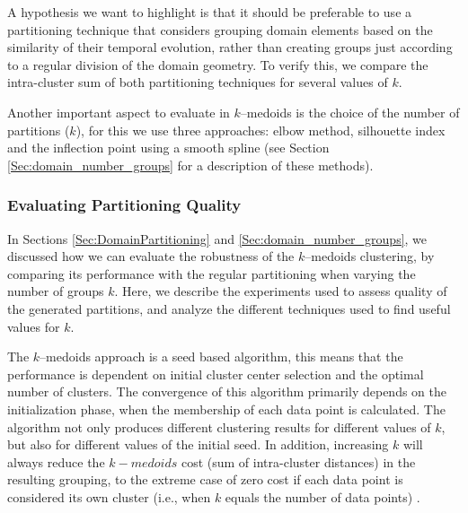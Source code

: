 A hypothesis we want to highlight is that it should be preferable to use a partitioning technique that considers grouping domain elements based on the similarity of their temporal evolution, rather than creating groups just according to a regular division of the domain geometry. To verify this, we compare the intra-cluster sum of both partitioning techniques for several values of $k$.

Another important aspect to evaluate in $k$--medoids is the choice of the number of partitions ($k$), for this we use three approaches: elbow method, silhouette index and the inflection point using a smooth spline (see Section \ref{Sec:domain_number_groups} for a description of these methods).

\subsubsection{Evaluating Partitioning Quality}
\label{Sec:EvaluatingPP}

In Sections \ref{Sec:DomainPartitioning} and \ref{Sec:domain_number_groups}, we discussed how we can evaluate the robustness of the $k$--medoids clustering, by comparing its performance with the regular partitioning when varying the number of groups $k$. Here, we describe the experiments used to assess quality of the generated partitions, and analyze the different techniques used to find useful values for $k$.  

The $k$--medoids approach is a seed based algorithm, this means that the performance is dependent on initial cluster center selection and the optimal number of clusters. The convergence of this algorithm primarily depends on the initialization phase, when the membership of each data point is calculated. The algorithm not only produces different clustering results for different values of $k$, but also for different values of the initial seed. In addition, increasing $k$ will always reduce the $k-medoids$ cost (sum of intra-cluster distances) in the resulting grouping, to the extreme case of zero cost if each data point is considered its own cluster (i.e., when $k$ equals the number of data points) \cite{HastieTF2009}. 

